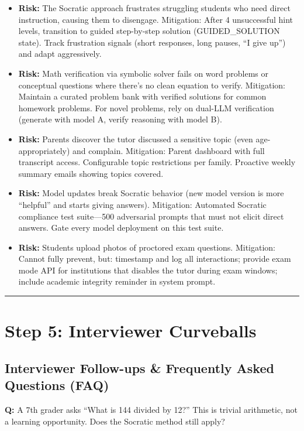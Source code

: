 \begin{itemize}
  \item \textbf{Risk:} The Socratic approach frustrates struggling students who need direct instruction, causing them to disengage. Mitigation: After 4 unsuccessful hint levels, transition to guided step-by-step solution (GUIDED\_SOLUTION state). Track frustration signals (short responses, long pauses, ``I give up'') and adapt aggressively.
  \item \textbf{Risk:} Math verification via symbolic solver fails on word problems or conceptual questions where there's no clean equation to verify. Mitigation: Maintain a curated problem bank with verified solutions for common homework problems. For novel problems, rely on dual-LLM verification (generate with model A, verify reasoning with model B).
  \item \textbf{Risk:} Parents discover the tutor discussed a sensitive topic (even age-appropriately) and complain. Mitigation: Parent dashboard with full transcript access. Configurable topic restrictions per family. Proactive weekly summary emails showing topics covered.
  \item \textbf{Risk:} Model updates break Socratic behavior (new model version is more ``helpful'' and starts giving answers). Mitigation: Automated Socratic compliance test suite---500 adversarial prompts that must not elicit direct answers. Gate every model deployment on this test suite.
  \item \textbf{Risk:} Students upload photos of proctored exam questions. Mitigation: Cannot fully prevent, but: timestamp and log all interactions; provide exam mode API for institutions that disables the tutor during exam windows; include academic integrity reminder in system prompt.
\end{itemize}

\bigskip\hrule\bigskip

\section*{Step 5: Interviewer Curveballs}

\subsection*{Interviewer Follow-ups \& Frequently Asked Questions (FAQ)}

\textbf{Q:} A 7th grader asks ``What is 144 divided by 12?'' This is trivial arithmetic, not a learning opportunity. Does the Socratic method still apply?


